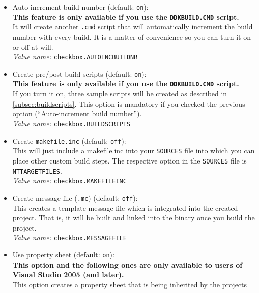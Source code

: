\documentclass[a4paper,titlepage]{report}
\newcommand{\important}[1]{\textcolor[rgb]{0.90,0.00,0.00}{\textbf{#1}}}
\newcommand{\default}[1]{\textcolor[gray]{0.40}{(default: \texttt{#1})}}
\newcommand{\option}[1]{\textcolor[rgb]{0.00,0.20,0.20}{\textsf{#1}}}
\newcommand{\optiondeco}[1]{#1\vspace{0.1cm}}
\newcommand{\inioption}[1]{\\\textcolor[rgb]{0.00,0.00,0.40}{\textsl{Value name:} \texttt{#1}}}
\begin{document}
\begin{itemize}
  This option allows you to create \texttt{C++} files instead of \texttt{C} files.
  This causes the compiler to perform stricter type checking and
  allows to use the syntax of \texttt{C++} (e.g. \texttt{C++}-style
  type-casts\footnote{... which I personally prefer ...}, declare
  variables just before you use them or create operators to convert
  between \texttt{WCHAR*} and \texttt{UNICODE\_STRING}, for example).
  \inioption{checkbox.STRICTERCPP}
  \item \optiondeco{\option{Auto-increment build number} \default{on}:}\\
  \important{This feature is only available if you use the \texttt{DDKBUILD.CMD} script.}\\
  It will create another \texttt{.cmd} script that will automatically
  increment the build number with every build. It is a matter of
  convenience so you can turn it on or off at will.
  \inioption{checkbox.AUTOINCBUILDNR}
  \item \optiondeco{\option{Create pre/post build scripts} \default{on}:}\\
  \important{This feature is only available if you use the \texttt{DDKBUILD.CMD} script.}\\
  If you turn it on, three sample scripts will be created as described in
  \autoref{subsec:buildscripts}. This option is mandatory if you
  checked the previous option (``Auto-increment build number'').
  \inioption{checkbox.BUILDSCRIPTS}
  \item \optiondeco{\option{Create \texttt{makefile.inc}} \default{off}:}\\
  This will just include a makefile.inc into your \texttt{SOURCES} file into which
  you can place other custom build steps. The respective option in the
  \texttt{SOURCES} file is \texttt{NTTARGETFILES}.
  \inioption{checkbox.MAKEFILEINC}
  \item \optiondeco{\option{Create message file (\texttt{.mc})} \default{off}:}\\
  This creates a template message file which is integrated into the
  created project. That is, it will be built and linked into the
  binary once you build the project.
  \inioption{checkbox.MESSAGEFILE}
  \item \optiondeco{\option{Use property sheet} \default{on}:}\\
  \important{This option and the following ones are only available to users of
  Visual Studio 2005 (and later).}\\
  This option creates a property sheet that is being inherited by the projects

\end{itemize}
\end{document}
